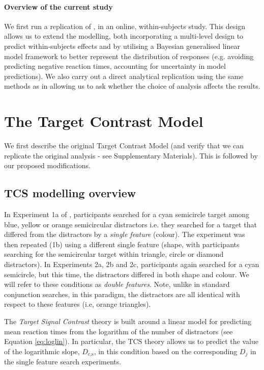 \documentclass[smallextended, natbib]{svjour3}       %
\begin{document}
\paragraph{Overview of the current study}
We first run a replication of \cite{buetti2019predicting}, in an online, within-subjects study. This design allows us to extend the modelling, both incorporating a multi-level design to predict within-subjects effects and by utilising a Bayesian generalised linear model framework to better represent the distribution of responses (e.g. avoiding predicting negative reaction times, accounting for uncertainty in model predictions). We  also carry out a direct analytical replication using the same methods as in \cite{buetti2019predicting} allowing us to ask whether the choice of analysis affects the results.

\section{The Target Contrast Model}
\label{sec:reansalysis}

We first describe the original Target Contrast Model (and verify that we can replicate the original analysis - see Supplementary Materials). This is followed by our proposed modifications.

\subsection{TCS modelling overview} 

In Experiment 1a of \cite{buetti2019predicting}, participants searched for a cyan semicircle target among blue, yellow or orange semicircular distractors i.e. they searched for a target that differed from the distractors by a \textit{single feature} (colour). The experiment was then repeated (1b) using a different single feature (shape, with participants searching for the semicircular target within triangle, circle or diamond distractors). In Experiments 2a, 2b and 2c, participants again searched for a cyan semicircle, but this time, the distractors differed in both shape and colour. We will refer to these conditions as \textit{double features}. Note, unlike in standard conjunction searches, in this paradigm, the distractors are all identical with respect to these features (i.e, orange triangles). 

The \textit{Target Signal Contrast} theory is built around a linear model for predicting mean reaction times from the logarithm of the number of distractors (see Equation \ref{eq:loglin}). In particular, the TCS theory allows us to predict the value of the logarithmic slope, $D_\text{c,s}$, in this condition based on the corresponding $D_j$ in the single feature search experiments. 
\end{document}
